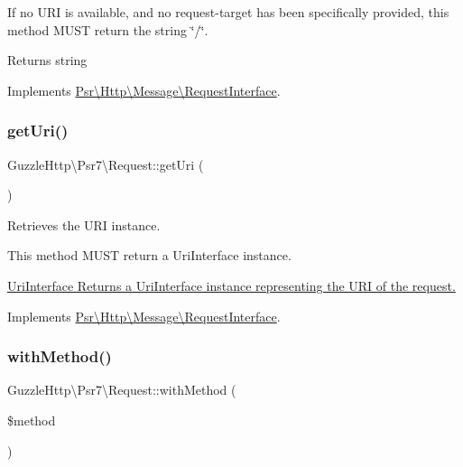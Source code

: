 If no U\+RI is available, and no request-\/target has been specifically provided, this method M\+U\+ST return the string \char`\"{}/\char`\"{}.

\begin{DoxyReturn}{Returns}
string 
\end{DoxyReturn}


Implements \hyperlink{interfacePsr_1_1Http_1_1Message_1_1RequestInterface_a4b9117fe12afd5c5555d3ae7d183ded2}{Psr\textbackslash{}\+Http\textbackslash{}\+Message\textbackslash{}\+Request\+Interface}.

\mbox{\label{classGuzzleHttp_1_1Psr7_1_1Request_a79d73a7f5e75d671a379ee95e3692a1e}} 
\subsubsection{\texorpdfstring{get\+Uri()}{getUri()}}
{\footnotesize\ttfamily Guzzle\+Http\textbackslash{}\+Psr7\textbackslash{}\+Request\+::get\+Uri (\begin{DoxyParamCaption}{ }\end{DoxyParamCaption})}

Retrieves the U\+RI instance.

This method M\+U\+ST return a Uri\+Interface instance.

\hyperlink{}{Uri\+Interface Returns a Uri\+Interface instance representing the U\+RI of the request. }

Implements \hyperlink{interfacePsr_1_1Http_1_1Message_1_1RequestInterface_a179c55f570319eb0736f9a8209c9cac6}{Psr\textbackslash{}\+Http\textbackslash{}\+Message\textbackslash{}\+Request\+Interface}.

\mbox{\label{classGuzzleHttp_1_1Psr7_1_1Request_a6e111abeaf2e319e31599bb97c4111fa}} 
\subsubsection{\texorpdfstring{with\+Method()}{withMethod()}}
{\footnotesize\ttfamily Guzzle\+Http\textbackslash{}\+Psr7\textbackslash{}\+Request\+::with\+Method (\begin{DoxyParamCaption}\item[{}]{\$method }\end{DoxyParamCaption})}

